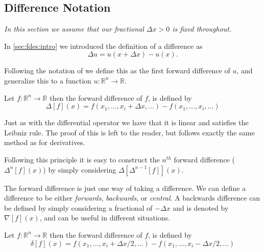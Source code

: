 \documentclass[../main.tex]{subfiles}
\begin{document}
  \subsection{Difference Notation}\label{sec:fdes:notation}
  \emph{In this section we assume that our fractional $\Delta x > 0$ is fixed throughout.}

  In \autoref{sec:fdes:intro} we introduced the definition of a difference as \\

  \begin{equation}
    \Delta u = u(x + \Delta x) - u(x).
  \end{equation}

  Following the notation of \cite{milne1933} we define this as the first forward difference of $u$, and generalize this to a function $u: \mathbb{R}^n \to \mathbb{R}$.

  \begin{definition}\label{fde:def:forward}
    Let $f: \mathbb{R}^n \to \mathbb{R}$ then the forward difference of $f$, is defined by
    \begin{equation}
      \Delta[f](x) = f(x_1, ..., x_i + \Delta x, ...) - f(x_1, ..., x_i, ...)
    \end{equation}
  \end{definition}

  \begin{remark}
    Just as with the differential operator we have that it is linear and satisfies the Leibniz rule. The proof of this is left to the reader, but follows exactly the same method as for derivatives.
  \end{remark}

  Following this principle it is easy to construct the $n^{th}$ forward difference ($\Delta ^n[f](x)$) by simply considering $\Delta [\Delta ^{n-1}[f]](x)$.

  The forward difference is just one way of taking a difference. We can define a difference to be either \emph{forwards}, \emph{backwards}, or \emph{central}. A backwards difference can be defined by simply considering a fractional of $- \Delta x$ and is denoted by $\nabla[f](x)$, and can be useful in different situations.

  \begin{definition}\label{fde:def:central}
    Let $f: \mathbb{R}^n \to \mathbb{R}$ then the forward difference of $f$, is defined by
     \begin{equation}
       \delta[f](x) = f(x_1, ..., x_i + \Delta x / 2, ...) - f(x_1, ..., x_i - \Delta x / 2, ...)
     \end{equation}
  \end{definition}
\end{document}
